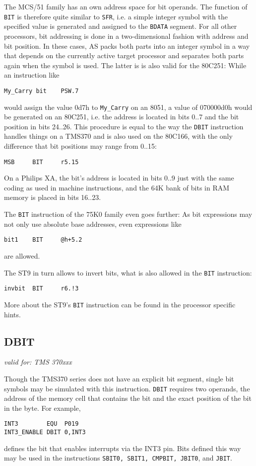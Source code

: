 \documentclass[12pt,twoside]{report}
\makeatletter
\newcommand{\tty}[1]{{\tt #1}}
\newcommand{\ttindex}[1]{\index{#1@{\tt #1}}}
\makeatother
\begin{document}
The MCS/51 family has an own address space for bit operands.  The function
of \tty{BIT} is therefore quite similar to \tty{SFR}, i.e. a simple integer
symbol with the specified value is generated and assigned to the
\tty{BDATA} segment.  For all other processors, bit addressing is done in
a two-dimensional fashion with address and bit position.  In these cases,
AS packs both parts into an integer symbol in a way that depends on the
currently active target processor and separates both parts again when the
symbol is used.  The latter is is also valid for the 80C251: While an
instruction like
\begin{verbatim}
My_Carry bit    PSW.7
\end{verbatim}
would assign the value 0d7h to \tty{My\_Carry} on an 8051, a value of
070000d0h would be generated on an 80C251, i.e. the address is located in
bits 0..7 and the bit position in bits 24..26.  This procedure is equal to
the way the \tty{DBIT} instruction handles things on a TMS370 and is also
used on the 80C166, with the only difference that bit positions may range
from 0..15:
\begin{verbatim}
MSB     BIT     r5.15
\end{verbatim}
On a Philips XA, the bit's address is located in bits 0..9 just with
the same coding as used in machine instructions, and the 64K bank of
bits in RAM memory is placed in bits 16..23.

The \tty{BIT} instruction of the 75K0 family even goes further: As bit
expressions may not only use absolute base addresses, even expressions
like
\begin{verbatim}
bit1    BIT     @h+5.2
\end{verbatim}
are allowed.

The ST9 in turn allows to invert bits, what is also allowed in the
\tty{BIT} instruction:
\begin{verbatim}
invbit  BIT     r6.!3
\end{verbatim}
More about the ST9's \tty{BIT} instruction can be found in the processor
specific hints.


\subsection{DBIT}
\ttindex{DBIT}

{\em valid for: TMS 370xxx}

Though the TMS370 series does not have an explicit bit segment, single bit
symbols may be simulated with this instruction.  \tty{DBIT} requires two
operands, the address of the memory cell that contains the bit and the
exact position of the bit in the byte.  For example,
\begin{verbatim}
INT3        EQU  P019
INT3_ENABLE DBIT 0,INT3
\end{verbatim}
defines the bit that enables interrupts via the INT3 pin.  Bits defined
this way may be used in the instructions \tty{SBIT0, SBIT1, CMPBIT,
JBIT0}, and \tty{JBIT}.
\end{document}
